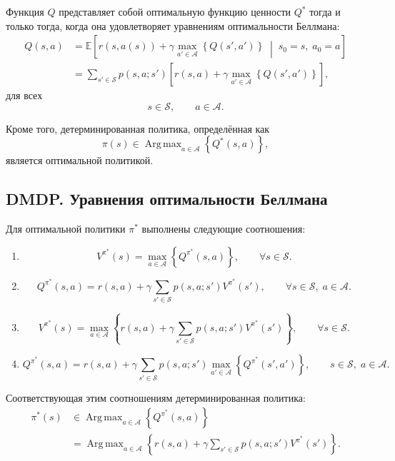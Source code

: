 \documentclass[12pt,a4paper]{article}
\begin{document}
Функция $Q$ представляет собой оптимальную функцию ценности $Q^\ast$ тогда и только тогда, когда она удовлетворяет уравнениям оптимальности Беллмана:
\[
\begin{aligned}
Q(s,a)
&=
\mathbb E
\left[
r(s,a(s))
+
\gamma
\max_{a' \in \mathcal A}
\left\{
Q(s',a')
\right\}
\;\middle|\;
s_0=s,\; a_0=a
\right]
\\
&=
\sum_{s' \in \mathcal S}
p(s,a;s')
\left[
r(s,a)
+
\gamma
\max_{a' \in \mathcal A}
\left\{
Q(s',a')
\right\}
\right],
\end{aligned}
\]
для всех
\[
s \in \mathcal S,
\qquad
a \in \mathcal A.
\]

Кроме того, детерминированная политика, определённая как
\[
\pi(s)
\in
\operatorname{Arg\,max}_{a \in \mathcal A}
\left\{
Q^\ast(s,a)
\right\},
\]
является оптимальной политикой.

\subsection{DMDP. Уравнения оптимальности Беллмана}

Для оптимальной политики $\pi^\ast$ выполнены следующие соотношения:

\begin{enumerate}
    \item
    \[
    V^{\pi^\ast}(s)
    =
    \max_{a \in \mathcal A}
    \left\{
    Q^{\pi^\ast}(s,a)
    \right\},
    \qquad
    \forall s \in \mathcal S.
    \]

    \item
    \[
    Q^{\pi^\ast}(s,a)
    =
    r(s,a)
    +
    \gamma
    \sum_{s' \in \mathcal S}
    p(s,a;s')V^{\pi^\ast}(s'),
    \qquad
    \forall s \in \mathcal S,\; a \in \mathcal A.
    \]

    \item
    \[
    V^{\pi^\ast}(s)
    =
    \max_{a \in \mathcal A}
    \left\{
    r(s,a)
    +
    \gamma
    \sum_{s' \in \mathcal S}
    p(s,a;s')V^{\pi^\ast}(s')
    \right\},
    \qquad
    \forall s \in \mathcal S.
    \]

    \item
    \[
    Q^{\pi^\ast}(s,a)
    =
    r(s,a)
    +
    \gamma
    \sum_{s' \in \mathcal S}
    p(s,a;s')
    \max_{a' \in \mathcal A}
    \left\{
    Q^{\pi^\ast}(s',a')
    \right\},
    \qquad
    s \in \mathcal S,\; a \in \mathcal A.
    \]
\end{enumerate}

Соответствующая этим соотношениям детерминированная политика:
\[
\begin{aligned}
\pi^\ast(s)
&\in
\operatorname{Arg\,max}_{a \in \mathcal A}
\left\{
Q^{\pi^\ast}(s,a)
\right\}
\\
&=
\operatorname{Arg\,max}_{a \in \mathcal A}
\left\{
r(s,a)
+
\gamma
\sum_{s' \in \mathcal S}
p(s,a;s')V^{\pi^\ast}(s')
\right\}.
\end{aligned}
\]
\end{document}
